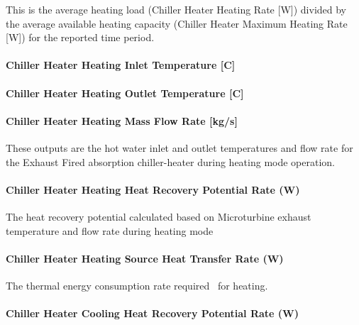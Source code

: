 This is the average heating load (Chiller Heater Heating Rate {[}W{]}) divided by the average available heating capacity (Chiller Heater Maximum Heating Rate {[}W{]}) for the reported time period.

\paragraph{Chiller Heater Heating Inlet Temperature {[}C{]}}\label{chiller-heater-heating-inlet-temperature-c-1}

\paragraph{Chiller Heater Heating Outlet Temperature {[}C{]}}\label{chiller-heater-heating-outlet-temperature-c-1}

\paragraph{Chiller Heater Heating Mass Flow Rate {[}kg/s{]}}\label{chiller-heater-heating-mass-flow-rate-kgs-1}

These outputs are the hot water inlet and outlet temperatures and flow rate for the Exhaust Fired absorption chiller-heater during heating mode operation.

\paragraph{Chiller Heater Heating Heat Recovery Potential Rate (W)}\label{chiller-heater-heating-heat-recovery-potential-rate-w}

The heat recovery potential calculated based on Microturbine exhaust temperature and flow rate during heating mode

\paragraph{Chiller Heater Heating Source Heat Transfer Rate (W)}\label{chiller-heater-heating-source-heat-transfer-rate-w}

The thermal energy consumption rate required~ for heating.

\paragraph{Chiller Heater Cooling Heat Recovery Potential Rate (W)}\label{chiller-heater-cooling-heat-recovery-potential-rate-w}

